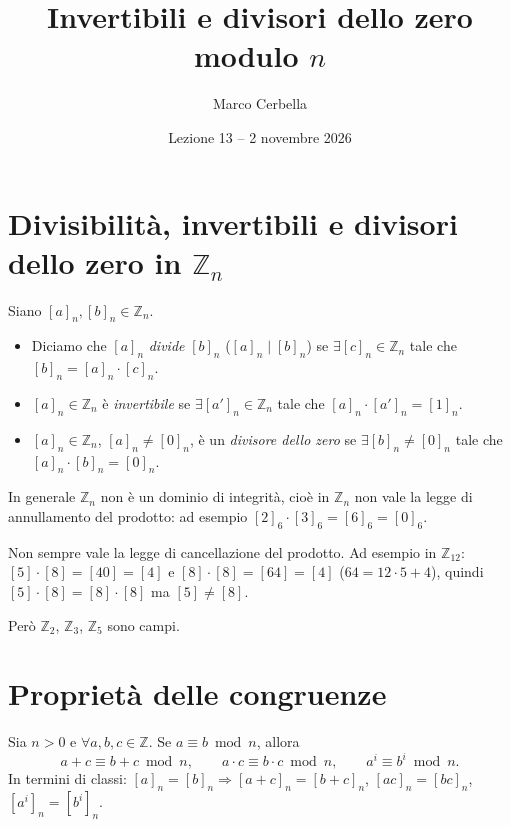 \documentclass[11pt,a4paper]{article}
\title{Invertibili e divisori dello zero modulo $n$}
\author{Marco Cerbella}
\date{Lezione 13 -- 2 novembre 2026}
\begin{document}
\maketitle

\section{Divisibilità, invertibili e divisori dello zero in $\mathbb{Z}_n$}

\begin{definizione}
Siano $[a]_n, [b]_n \in \mathbb{Z}_n$.
\begin{itemize}
  \item Diciamo che $[a]_n$ \emph{divide} $[b]_n$ ($[a]_n \mid [b]_n$) se $\exists [c]_n \in \mathbb{Z}_n$ tale che $[b]_n = [a]_n\cdot[c]_n$.
  \item $[a]_n \in \mathbb{Z}_n$ è \emph{invertibile} se $\exists [a']_n \in \mathbb{Z}_n$ tale che $[a]_n\cdot[a']_n = [1]_n$.
  \item $[a]_n \in \mathbb{Z}_n$, $[a]_n \neq [0]_n$, è un \emph{divisore dello zero} se $\exists [b]_n \neq [0]_n$ tale che $[a]_n\cdot[b]_n = [0]_n$.
\end{itemize}
\end{definizione}

\begin{osservazione}
In generale $\mathbb{Z}_n$ non è un dominio di integrità, cioè in $\mathbb{Z}_n$ non vale la legge di annullamento del prodotto: ad esempio $[2]_6\cdot[3]_6 = [6]_6 = [0]_6$.

Non sempre vale la legge di cancellazione del prodotto. Ad esempio in $\mathbb{Z}_{12}$: $[5]\cdot[8] = [40] = [4]$ e $[8]\cdot[8] = [64] = [4]$ ($64 = 12\cdot 5 + 4$), quindi $[5]\cdot[8] = [8]\cdot[8]$ ma $[5] \neq [8]$.

Però $\mathbb{Z}_2$, $\mathbb{Z}_3$, $\mathbb{Z}_5$ sono campi.
\end{osservazione}

\section{Proprietà delle congruenze}

\begin{proprieta}[Corollario]
Sia $n > 0$ e $\forall a, b, c \in \mathbb{Z}$. Se $a \equiv b \bmod n$, allora
\[
  a + c \equiv b + c \bmod n, \qquad a\cdot c \equiv b\cdot c \bmod n, \qquad a^i \equiv b^i \bmod n .
\]
In termini di classi: $[a]_n = [b]_n \Rightarrow [a + c]_n = [b + c]_n$, $[ac]_n = [bc]_n$, $[a^i]_n = [b^i]_n$.
\end{proprieta}
\end{document}
